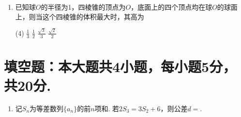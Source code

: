 \documentclass[12pt,space]{ctexart} %
\begin{document}
\begin{enumerate}[itemsep=0.2em,topsep=0pt]
  \item 已知球$O$的半径为1，四棱锥的顶点为$O$，底面上的四个顶点均在球$O$的球面上，则当这个四棱锥的体积最大时，其高为
  \begin{tasks}(4)
   \task $\displaystyle{\frac 13}$
   \task $\displaystyle{\frac 12}$
   \task $\displaystyle{\frac {\sqrt{3}}{3}}$
   \task $\displaystyle{\frac {\sqrt{2}}{2}}$
  \end{tasks}

\end{enumerate}

\section{填空题：本大题共4小题，每小题5分，共20分.}
\begin{enumerate}[itemsep=0.2em,topsep=0pt, resume]

  \item 记$S_n$为等差数列$\{a_n\}$的前$n$项和. 若$2S_3=3S_2+6$，则公差$d=$.

\end{enumerate}

\clearpage
\end{document}
